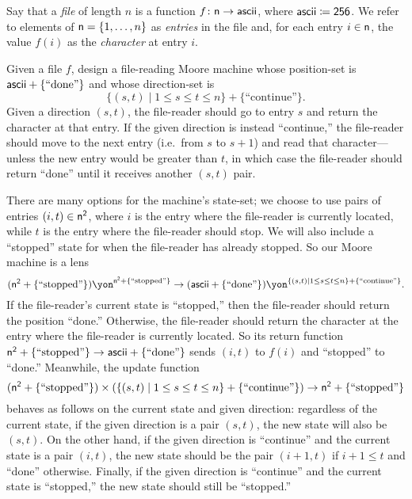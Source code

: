 \documentclass[Book-Poly]{subfiles}
\begin{document}
\begin{exercise}\label{exc.file_reader}
Say that a \emph{file} of length $n$ is a function $f\colon\mathsf{n}\to\mathsf{ascii}$, where $\mathsf{ascii}\coloneqq\textsf{2}\textsf{5}\textsf{6}$.
We refer to elements of $\mathsf{n}=\{1,\ldots,n\}$ as \emph{entries} in the file and, for each entry $i\in\mathsf{n}$, the value $f(i)$ as the \emph{character} at entry $i$.

Given a file $f$, design a file-reading Moore machine whose position-set is $\mathsf{ascii} + \{\text{``done''}\}$
and whose direction-set is
\[
\{(s,t)\mid 1\leq s\leq t\leq n\}+\{\text{``continue''}\}.
\]
Given a direction $(s,t)$, the file-reader should go to entry $s$ and return the character at that entry.
If the given direction is instead ``continue,'' the file-reader should move to the next entry (i.e.\ from $s$ to $s+1$) and read that character---unless the new entry would be greater than $t$, in which case the file-reader should return ``done'' until it receives another $(s,t)$ pair.
\begin{solution}
There are many options for the machine's state-set; we choose to use pairs of entries $(i,t)\in\mathsf{n}^{\textsf{2}}$, where $i$ is the entry where the file-reader is currently located, while $t$ is the entry where the file-reader should stop.
We will also include a ``stopped'' state for when the file-reader has already stopped.
So our Moore machine is a lens
\[
    (\ord{n}^\2+\{\text{``stopped''}\})\yon^{\ord{n}^\2+\{\text{``stopped''}\}} \to (\Set{ascii} + \{\text{``done''}\})\yon^{\{(s,t)\mid 1\leq s\leq t\leq n\}+\{\text{``continue''}\}}.
\]
If the file-reader's current state is ``stopped,'' then the file-reader should return the position ``done.''
Otherwise, the file-reader should return the character at the entry where the file-reader is currently located.
So its return function $\mathsf{n}^{\textsf{2}}+\{\text{``stopped''}\} \to \mathsf{ascii} + \{\text{``done''}\}$ sends $(i, t)$ to $f(i)$ and ``stopped'' to ``done.''
Meanwhile, the update function
\[
    (\mathsf{n}^{\textsf{2}}+\{\text{``stopped''}\}) \times (\{(s,t)\mid 1\leq s\leq t\leq n\}+\{\text{``continue''}\}) \to \mathsf{n}^{\textsf{2}}+\{\text{``stopped''}\}
\]
behaves as follows on the current state and given direction: regardless of the current state, if the given direction is a pair $(s,t)$, the new state will also be $(s,t)$.
On the other hand, if the given direction is ``continue'' and the current state is a pair $(i,t)$, the new state should be the pair $(i+1,t)$ if $i+1\leq t$ and ``done'' otherwise.
Finally, if the given direction is ``continue'' and the current state is ``stopped,'' the new state should still be ``stopped.''
\end{solution}
\end{exercise}
\end{document}
